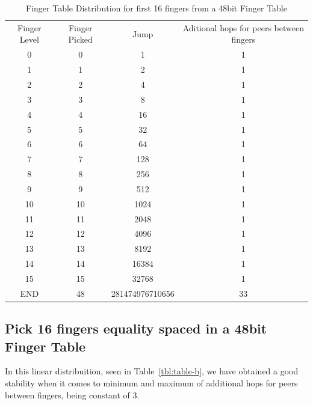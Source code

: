 \begin{table}
    \centering
    \begin{tabular}{| c | c | c | c |}
    \hline
        Finger Level &  Finger Picked & Jump & Aditional hops for peers between fingers \\
        0 & 0 & 1 & 1 \\
        1 & 1 & 2 & 1 \\
        2 & 2 & 4 & 1 \\
        3 & 3 & 8 & 1 \\
        4 & 4 & 16 & 1 \\
        5 & 5 & 32 & 1 \\
        6 & 6 & 64 & 1 \\
        7 & 7 & 128 & 1 \\
        8 & 8 & 256 & 1 \\
        9 & 9 & 512 & 1 \\
        10 & 10 & 1024 & 1 \\
        11 & 11 & 2048 & 1 \\
        12 & 12 & 4096 & 1 \\
        13 & 13 & 8192 & 1 \\
        14 & 14 & 16384 & 1 \\
        15 & 15 & 32768 & 1 \\
        END & 48 & 281474976710656 & 33 \\
    \hline
    \end{tabular}
    \caption{Finger Table Distribution for first 16 fingers from a 48bit Finger Table}
    \label{tbl:table-a}
\end{table}

\subsection{Pick 16 fingers equality spaced in a 48bit Finger Table}

In this linear distribuition, seen in Table~\ref{tbl:table-b}, we have obtained a good stability when it comes to minimum and maximum of additional hops for peers between fingers, being constant of 3.

